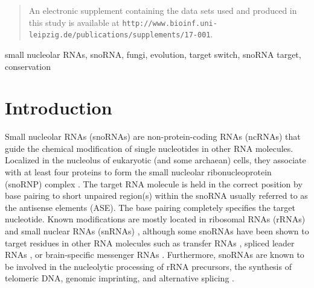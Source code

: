 \documentclass[preprint,3p,times,twocolumn]{elsarticle}
\newcommand{\url}[1]{\texttt{\small #1}}
\newcommand{\sno}{snoRNA}
\begin{document}
\begin{frontmatter}
\begin{abstract}
  An electronic supplement containing the data sets used and produced in
  this study is available at
  \url{http://www.bioinf.uni-leipzig.de/publications/supplements/17-001}. 
\end{abstract}

\begin{keyword}
  small nucleolar RNAs, snoRNA, fungi, evolution, target switch, snoRNA target, 	
  conservation	
\end{keyword}

\end{frontmatter}


\section{Introduction}

Small nucleolar RNAs (snoRNAs) are non-protein-coding RNAs (ncRNAs) that
guide the chemical modification of single nucleotides in other RNA
molecules.  Localized in the nucleolus of eukaryotic (and some archaean)
cells, they associate with at least four proteins to form the small
nucleolar ribonucleoprotein (snoRNP) complex \cite{Reichow:2007}.  The
target RNA molecule is held in the correct position by base pairing to
short unpaired region(s) within the snoRNA usually referred to as the
antisense elements (ASE). The base pairing completely specifies the target
nucleotide. Known modifications are mostly located in ribosomal RNAs
(rRNAs) and small nuclear RNAs (snRNAs)
\cite{Decatur:2002,Darzacq:2002,Bratkovi:2011}, although some snoRNAs have
been shown to target residues in other RNA molecules such as transfer RNAs
\cite{Clouet_d'Orval:2001,Dennis:2001}, spliced leader RNAs
\cite{Uliel:2004}, or brain-specific messenger RNAs \cite{Cavaillé:2000,
  Kishore:2006}. Furthermore, {\sno}s are known to be involved in the
nucleolytic processing of rRNA precursors, the synthesis of telomeric DNA,
genomic imprinting, and alternative splicing
\cite{Maxwell:1995,Tollervey:1997,Kiss:2002,Matera:2007}.
\end{document}
